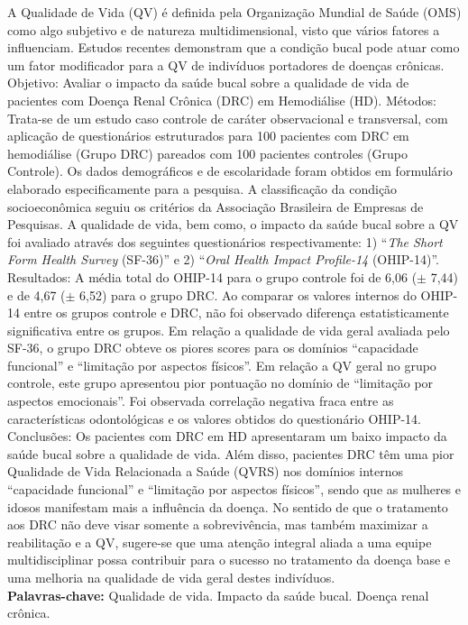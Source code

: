 \begin{resumo}

{\noindent A Qualidade de Vida (QV) é definida pela Organização Mundial de Saúde (OMS) como algo subjetivo e de natureza multidimensional, visto que vários fatores a influenciam. Estudos recentes demonstram que a condição bucal pode atuar como um fator modificador para a QV de indivíduos portadores de doenças crônicas. Objetivo: Avaliar o impacto da saúde bucal sobre a qualidade de vida de pacientes com Doença Renal Crônica (DRC) em Hemodiálise (HD). Métodos: Trata-se de um estudo caso controle de caráter observacional e transversal, com aplicação de questionários estruturados para 100 pacientes com DRC em hemodiálise (Grupo DRC) pareados com 100 pacientes controles (Grupo Controle). Os dados demográficos e de escolaridade foram obtidos em formulário elaborado especificamente para a pesquisa. A classificação da condição socioeconômica seguiu os critérios da Associação Brasileira de Empresas de Pesquisas. A qualidade de vida, bem como, o impacto da saúde bucal sobre a QV foi avaliado através dos seguintes questionários respectivamente: 1) “\textit{The Short Form Health Survey} (SF-36)” e 2) “\textit{Oral Health Impact Profile-14} (OHIP-14)”. Resultados: A média total do OHIP-14 para o grupo controle foi de 6,06 ($\pm$ 7,44) e de 4,67 ($\pm$ 6,52) para o grupo DRC. Ao comparar os valores internos do OHIP-14 entre os grupos controle e DRC, não foi observado diferença estatisticamente significativa entre os grupos. Em relação a qualidade de vida geral avaliada pelo SF-36, o grupo DRC obteve os piores scores para os domínios “capacidade funcional” e “limitação por aspectos físicos”. Em relação a QV geral no grupo controle, este grupo apresentou pior pontuação no domínio de “limitação por aspectos emocionais”. Foi observada correlação negativa fraca entre as características odontológicas e os valores obtidos do questionário OHIP-14. Conclusões: Os pacientes com DRC em HD apresentaram um baixo impacto da saúde bucal sobre a qualidade de vida. Além disso, pacientes DRC têm uma pior Qualidade de Vida Relacionada a Saúde (QVRS) nos domínios internos “capacidade funcional” e “limitação por aspectos físicos”, sendo que as mulheres e idosos manifestam mais a influência da doença. No sentido de que o tratamento aos DRC não deve visar somente a sobrevivência, mas também maximizar a reabilitação e a QV, sugere-se que uma atenção integral aliada a uma equipe multidisciplinar possa contribuir para o sucesso no tratamento da doença base e uma melhoria na qualidade de vida geral destes indivíduos.\\

}
{\noindent \textbf{Palavras-chave:}  Qualidade de vida. Impacto da saúde bucal. Doença renal crônica.}

\end{resumo}
